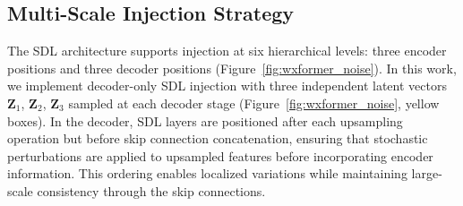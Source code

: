 \documentclass{agujournal2019}
\begin{document}


\subsection{Multi-Scale Injection Strategy}
The SDL architecture supports injection at six hierarchical levels: three encoder positions and three decoder positions (Figure~\ref{fig:wxformer_noise}). In this work, we implement decoder-only SDL injection with three independent latent vectors $\mathbf{Z}_1$, $\mathbf{Z}_2$, $\mathbf{Z}_3$ sampled at each decoder stage (Figure~\ref{fig:wxformer_noise}, yellow boxes). In the decoder, SDL layers are positioned after each upsampling operation but before skip connection concatenation, ensuring that stochastic perturbations are applied to upsampled features before incorporating encoder information. This ordering enables localized variations while maintaining large-scale consistency through the skip connections.
\end{document}
